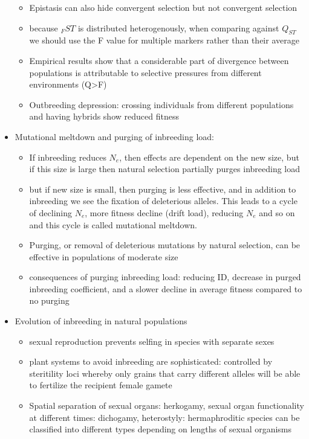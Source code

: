 \documentclass[12pt]{amsart}
\begin{document}
\begin{itemize}
\begin{itemize}
\item Epistasis can also hide convergent selection but not convergent selection
\item because $_F{ST}$ is distributed heterogenously, when comparing against $Q_{ST}$ we should use the F value for multiple markers rather than their average 
\item Empirical results show that a considerable part of divergence between populations is attributable to selective pressures from different environments (Q>F)
\item Outbreeding depression: crossing individuals from different populations and having hybrids show reduced fitness 
\end{itemize}
\item Mutational meltdown and purging of inbreeding load:
\begin{itemize}
\item If inbreeding reduces $N_e$, then effects are dependent on the new size, but if this size is large then natural selection partially purges inbreeding load 
\item but if new size is small, then purging is less effective, and in addition to inbreeding we see the fixation of deleterious alleles. This leads to a cycle of declining $N_e$, more fitness decline (drift load), reducing $N_e$ and so on and this cycle is called mutational meltdown. 
\item Purging, or removal of deleterious mutations by natural selection, can be effective in populations of moderate size 
\item consequences of purging inbreeding load: reducing ID, decrease in purged inbreeding coefficient, and a slower decline in average fitness compared to no purging 
\end{itemize}
\item Evolution of inbreeding in natural populations
\begin{itemize}
\item sexual reproduction prevents selfing in species with separate sexes
\item plant systems to avoid inbreeding are sophisticated: controlled by steritility loci whereby only grains that carry different alleles will be able to fertilize the recipient female gamete
\item Spatial separation of sexual organs: herkogamy, sexual organ functionality at different times: dichogamy, heterostyly: hermaphroditic species can be classified into different types depending on lengths of sexual organisms 

\end{itemize}
\end{itemize}
\end{document}
